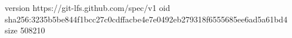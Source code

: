 version https://git-lfs.github.com/spec/v1
oid sha256:3235b5be844f1bcc27c0cdffacbe4e7e0492eb279318f6555685ee6ad5a61bd4
size 508210
